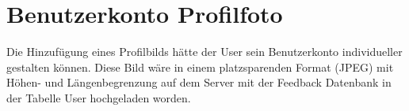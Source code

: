 \section{Benutzerkonto Profilfoto}
\author{Stefano Pyringer}
Die Hinzufügung eines Profilbilds hätte der User sein Benutzerkonto individueller gestalten können. Diese Bild wäre in einem 
platzsparenden Format (JPEG) mit Höhen- und Längenbegrenzung auf dem Server mit der Feedback Datenbank in der Tabelle User hochgeladen worden.
